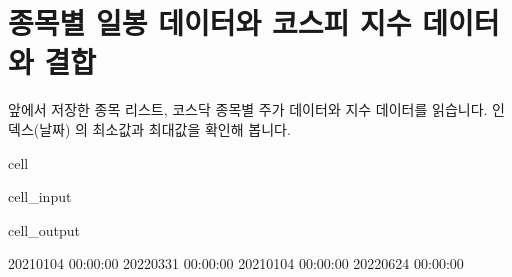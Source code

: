 \documentclass[letterpaper,10pt,english]{jupyterBook}
\begin{document}
\part{종목별 일봉 데이터와 코스피 지수 데이터와 결합}
\label{\detokenize{chapter4/4.4.3_Data_Collection:id1}}\label{\detokenize{chapter4/4.4.3_Data_Collection::doc}}
\sphinxAtStartPar
앞에서 저장한 종목 리스트, 코스닥 종목별 주가 데이터와 지수 데이터를 읽습니다. 인덱스(날짜) 의 최소값과 최대값을 확인해 봅니다.

\begin{sphinxuseclass}{cell}\begin{sphinxVerbatimInput}

\begin{sphinxuseclass}{cell_input}
\begin{sphinxVerbatim}[commandchars=\\\{\}]
   
   
   

 
 
\end{sphinxVerbatim}

\end{sphinxuseclass}\end{sphinxVerbatimInput}
\begin{sphinxVerbatimOutput}

\begin{sphinxuseclass}{cell_output}
\begin{sphinxVerbatim}[commandchars=\\\{\}]
2021\PYGZhy{}01\PYGZhy{}04 00:00:00 2022\PYGZhy{}03\PYGZhy{}31 00:00:00
2021\PYGZhy{}01\PYGZhy{}04 00:00:00 2022\PYGZhy{}06\PYGZhy{}24 00:00:00
\end{sphinxVerbatim}

\end{sphinxuseclass}\end{sphinxVerbatimOutput}

\end{sphinxuseclass}
\end{document}

